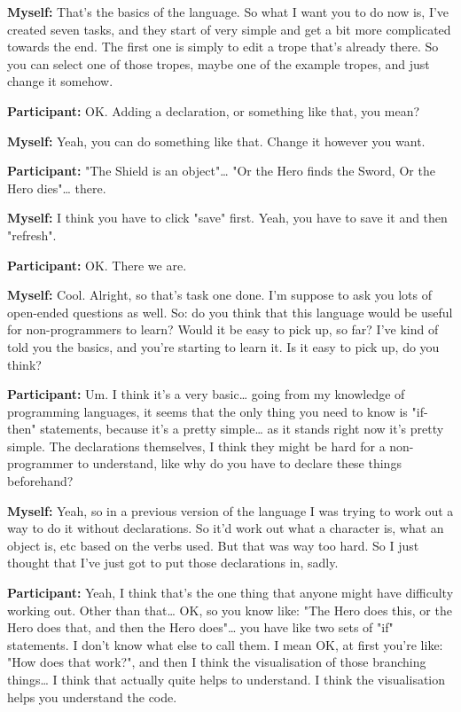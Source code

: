 \documentclass[11pt]{report}
\newcommand{\llabel}[1]{\hypertarget{llineno:#1}{\linelabel{#1}}}
\begin{document}
\begin{linenumbers}
\textbf{Myself:} That's the basics of the language. So what I want you to do now is, I've created seven tasks, and they start of very simple and get a bit more complicated towards the end. The first one is simply to edit a trope that's already there. So you can select one of those tropes, maybe one of the example tropes, and just change it somehow.

\textbf{Participant:} OK. Adding a declaration, or something like that, you mean?

\textbf{Myself:} Yeah, you can do something like that. Change it however you want.

\textbf{Participant:} "The Shield is an object"\ldots{} "Or the Hero finds the Sword, Or the Hero dies"\ldots{} there.

\textbf{Myself:} I think you have to click "save" first. Yeah, you have to save it and then "refresh".

\textbf{Participant:} OK. There we are.

\textbf{Myself:} Cool. Alright, so that's task one done. I'm suppose to ask you lots of open-ended questions as well. So: do you think that this language would be useful for non-programmers to learn? Would it be easy to pick up, so far? I've kind of told you the basics, and you're starting to learn it. Is it easy to pick up, do you think?

\textbf{Participant:} Um. I think it's a very basic\ldots{} going from my
knowledge of programming languages, it seems that the only thing you need to
know is "if-then" statements, because it's a pretty simple\ldots{} as it stands
right now it's pretty simple. The declarations themselves, I think they might be
hard for a non-programmer to understand, like why do you have to declare these
things beforehand?\llabel{lne:use1e}

\textbf{Myself:} Yeah, so in a previous version of the language I was trying to work out a way to do it without declarations. So it'd work out what a character is, what an object is, etc based on the verbs used. But that was way too hard. So I just thought that I've just got to put those declarations in, sadly.

\textbf{Participant:} Yeah, I think that's the one thing that anyone might have difficulty working out. Other than that\ldots{} OK, so you know like: "The Hero does this, or the Hero does that, and then the Hero does"\ldots{} you have like two sets of "if" statements. I don't know what else to call them. I mean OK, at first you're like: "How does that work?", and then I think the visualisation of those branching things\ldots{} I think that actually quite helps to understand. I think the visualisation helps you understand the code.\llabel{lne:use2e}


\end{linenumbers}
\end{document}
